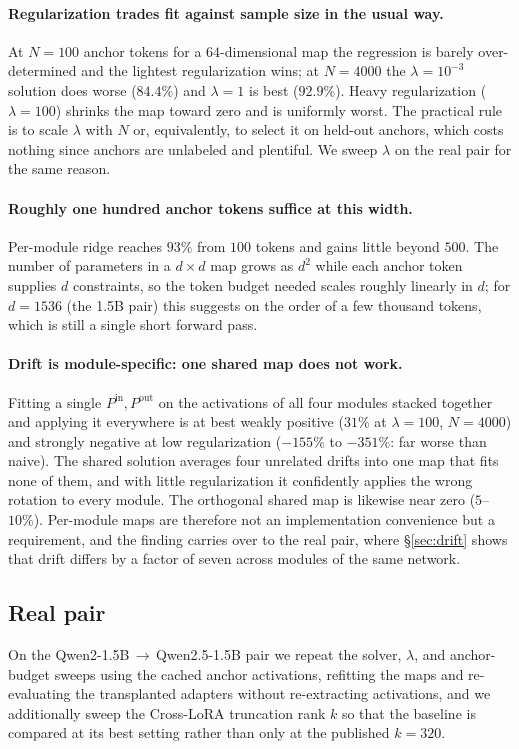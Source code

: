 \paragraph{Regularization trades fit against sample size in the usual way.}
At $N=100$ anchor tokens for a $64$-dimensional map the regression is barely
over-determined and the lightest regularization wins; at $N=4000$ the
$\lambda=10^{-3}$ solution does worse ($84.4\%$) and $\lambda=1$ is best
($92.9\%$). Heavy regularization ($\lambda=100$) shrinks the map toward zero
and is uniformly worst. The practical rule is to scale $\lambda$ with $N$ or,
equivalently, to select it on held-out anchors, which costs nothing since
anchors are unlabeled and plentiful. We sweep $\lambda$ on the real pair for
the same reason.

\paragraph{Roughly one hundred anchor tokens suffice at this width.}
Per-module ridge reaches $93\%$ from $100$ tokens and gains little beyond
$500$. The number of parameters in a $d\times d$ map grows as $d^2$ while each
anchor token supplies $d$ constraints, so the token budget needed scales
roughly linearly in $d$; for $d=1536$ (the 1.5B pair) this suggests on the
order of a few thousand tokens, which is still a single short forward pass.

\paragraph{Drift is module-specific: one shared map does not work.}
Fitting a single $P^{\mathrm{in}},P^{\mathrm{out}}$ on the activations of all
four modules stacked together and applying it everywhere is at best weakly
positive ($31\%$ at $\lambda=100$, $N=4000$) and strongly negative at low
regularization ($-155\%$ to $-351\%$: far worse than naive). The shared
solution averages four unrelated drifts into one map that fits none of them,
and with little regularization it confidently applies the wrong rotation to
every module. The orthogonal shared map is likewise near zero ($5$--$10\%$).
Per-module maps are therefore not an implementation convenience but a
requirement, and the finding carries over to the real pair, where
\S\ref{sec:drift} shows that drift differs by a factor of seven across modules
of the same network.

\subsection{Real pair}
\label{sec:ablations:real}
% 
On the Qwen2-1.5B\,$\to$\,Qwen2.5-1.5B pair we repeat the solver, $\lambda$,
and anchor-budget sweeps using the cached anchor activations, refitting the
maps and re-evaluating the transplanted adapters without re-extracting
activations, and we additionally sweep the Cross-LoRA truncation rank $k$ so
that the baseline is compared at its best setting rather than only at the
published $k=320$.

